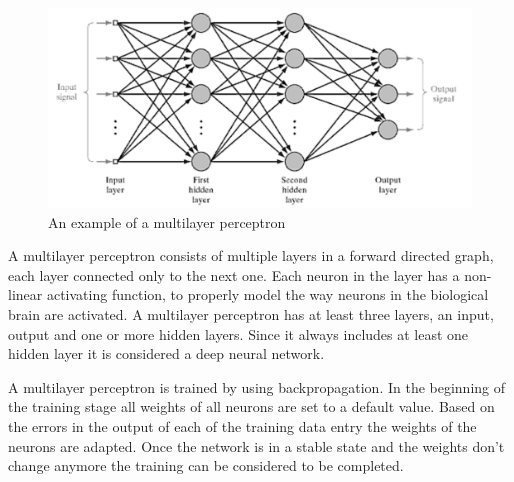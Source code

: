 \begin{figure}[!ht]
	\centering
	\includegraphics[width=1.0\textwidth]{images/multilayer-perceptron}
	\caption{An example of a multilayer perceptron \cite{MultilayerPerceptron}}
	\label{fig:multilayer-perceptron}
\end{figure}

A multilayer perceptron consists of multiple layers in a forward directed graph, each layer connected only to the next one. Each neuron in the layer has a non-linear activating function, to properly model the way neurons in the biological brain are activated. A multilayer perceptron has at least three layers, an input, output and one or more hidden layers. Since it always includes at least one hidden layer it is considered a deep neural network.

A multilayer perceptron is trained by using backpropagation. In the beginning of the training stage all weights of all neurons are set to a default value. Based on the errors in the output of each of the training data entry the weights of the neurons are adapted. Once the network is in a stable state and the weights don't change anymore the training can be considered to be completed.